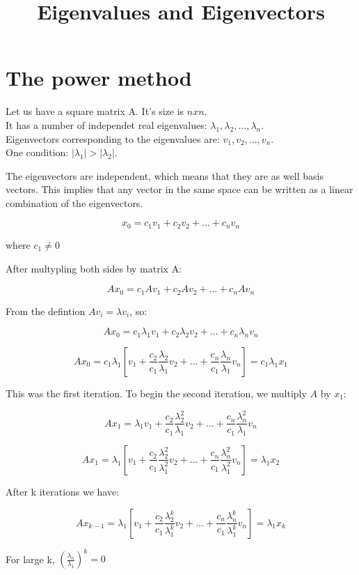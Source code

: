 \documentclass{article}
\title{Eigenvalues and Eigenvectors}
\begin{document}
  \maketitle
  \newpage

\section*{The power method}

Let us have a square matrix A. It's size is $nxn$. \\
It has a number of independet real eigenvalues: $\lambda_1, \lambda_2, \dots, \lambda_n$. \\
Eigenvectors corresponding to the eigenvalues are: $v_1, v_2, \dots, v_n$. \\
One condition: $|\lambda_1| > |\lambda_2|$.

The eigenvectors are independent, which means that they are as well basis vectors. This implies that any vector in the same space can be written as a linear combination of the eigenvectors.

$$x_0 = c_1v_1+c_2v_2+\dots+c_nv_n$$

where $c_1\ne0$

After multypling both sides by matrix A:

$$Ax_0 = c_1Av_1+c_2Av_2+\dots+c_nAv_n$$

From the defintion $Av_i = \lambda{v_i}$, so:

$$Ax_0 = c_1\lambda_1v_1+c_2\lambda_2v_2+\dots+c_n\lambda_nv_n$$

$$Ax_0 = c_1\lambda_1[v_1+\frac{c_2}{c_1}\frac{\lambda_2}{\lambda_1}v_2+\dots+\frac{c_n}{c_1}\frac{\lambda_n}{\lambda_1}v_n]= c_1\lambda_1x_1$$

This was the first iteration. To begin the second iteration, we multiply $A$ by $x_1$:

$$Ax_1 = \lambda_1{v_1}+\frac{c_2}{c_1}\frac{\lambda_2^2}{\lambda_1}v_2+\dots+\frac{c_n}{c_1}\frac{\lambda_n^2}{\lambda_1}v_n$$

$$Ax_1 = \lambda_1[v_1+\frac{c_2}{c_1}\frac{\lambda_2^2}{\lambda_1^2}v_2+\dots+\frac{c_n}{c_1}\frac{\lambda_n^2}{\lambda_1^2}v_n] = \lambda_1x_2$$

After k iterations we have:

$$Ax_{k-1} = \lambda_1[v_1+\frac{c_2}{c_1}\frac{\lambda_2^k}{\lambda_1^k}v_2+\dots+\frac{c_n}{c_1}\frac{\lambda_n^k}{\lambda_1^k}v_n] = \lambda_1x_k$$


For large k, $(\frac{\lambda_n}{\lambda_1})^{k} = 0$
\end{document}
